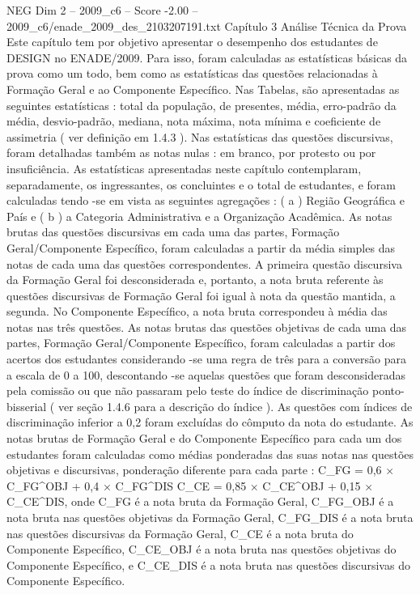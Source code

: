 \begin{textsample}{NEG Dim 2 – 2009\_c6 – Score -2.00 – 2009\_c6/enade\_2009\_des\_2103207191.txt}  \label{ex:f2_neg_139}
Capítulo 3 Análise Técnica da Prova Este capítulo tem por objetivo apresentar o desempenho dos estudantes de DESIGN no ENADE/2009.
Para isso, foram calculadas as estatísticas básicas da prova como um todo, bem como as estatísticas das questões relacionadas à Formação Geral e ao Componente Específico.
Nas Tabelas, são apresentadas as seguintes estatísticas : total da população, de presentes, média, erro-padrão da média, desvio-padrão, mediana, nota máxima, nota mínima e coeficiente de assimetria ( ver definição em 1.4.3 ).
Nas estatísticas das questões discursivas, foram detalhadas também as notas nulas : em branco, por protesto ou por insuficiência.
As estatísticas apresentadas neste capítulo contemplaram, separadamente, os ingressantes, os concluintes e o total de estudantes, e foram calculadas tendo -se em vista as seguintes agregações : ( a ) Região Geográfica e País e ( b ) a Categoria Administrativa e a Organização Acadêmica.
As notas brutas das questões discursivas em cada uma das partes, Formação Geral/Componente Específico, foram calculadas a partir da média simples das notas de cada uma das questões correspondentes.
A primeira questão discursiva da Formação Geral foi desconsiderada e, portanto, a nota bruta referente às questões discursivas de Formação Geral foi igual à nota da questão mantida, a segunda.
No Componente Específico, a nota bruta correspondeu à média das notas nas três questões.
As notas brutas das questões objetivas de cada uma das partes, Formação Geral/Componente Específico, foram calculadas a partir dos acertos dos estudantes considerando -se uma regra de três para a conversão para a escala de 0 a 100, descontando -se aquelas questões que foram desconsideradas pela comissão ou que não passaram pelo teste do índice de discriminação ponto-bisserial ( ver seção 1.4.6 para a descrição do índice ).
As questões com índices de discriminação inferior a 0,2 foram excluídas do cômputo da nota do estudante.
As notas brutas de Formação Geral e do Componente Específico para cada um dos estudantes foram calculadas como médias ponderadas das suas notas nas questões objetivas e discursivas, ponderação diferente para cada parte : C\_FG = 0,6 × C\_FG\textasciicircum{}OBJ + 0,4 × C\_FG\textasciicircum{}DIS C\_CE = 0,85 × C\_CE\textasciicircum{}OBJ + 0,15 × C\_CE\textasciicircum{}DIS, onde C\_FG é a nota bruta da Formação Geral, C\_FG\_OBJ é a nota bruta nas questões objetivas da Formação Geral, C\_FG\_DIS é a nota bruta nas questões discursivas da Formação Geral, C\_CE é a nota bruta do Componente Específico, C\_CE\_OBJ é a nota bruta nas questões objetivas do Componente Específico, e C\_CE\_DIS é a nota bruta nas questões discursivas do Componente Específico.

\end{textsample}
